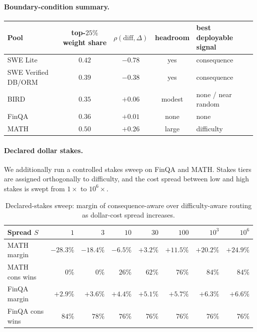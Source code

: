 \documentclass{article}
\begin{document}
\paragraph{Boundary-condition summary.}
\begin{center}
\small
\begin{tabular}{lcccl}
\toprule
Pool & top-$25\%$ weight share & $\rho(\mathrm{diff},\Delta)$ & headroom & best deployable signal \\
\midrule
SWE Lite & $0.42$ & $-0.78$ & yes & consequence \\
SWE Verified DB/ORM & $0.39$ & $-0.38$ & yes & consequence \\
BIRD & $0.35$ & $+0.06$ & modest & none / near random \\
FinQA & $0.36$ & $+0.01$ & none & none \\
MATH & $0.50$ & $+0.26$ & large & difficulty \\
\bottomrule
\end{tabular}
\end{center}

\paragraph{Declared dollar stakes.}
We additionally run a controlled stakes sweep on FinQA and MATH. Stakes
tiers are assigned orthogonally to difficulty, and the cost spread
between low and high stakes is swept from $1\times$ to $10^6\times$.

\begin{table}[h]
\centering
\caption{Declared-stakes sweep: margin of consequence-aware over
difficulty-aware routing as dollar-cost spread increases.}
\label{tab:stakescross}
\small
\begin{tabular}{lrrrrrrr}
\toprule
Spread $S$ & $1$ & $3$ & $10$ & $30$ & $100$ & $10^3$ & $10^6$ \\
\midrule
MATH margin & $-28.3\%$ & $-18.4\%$ & $-6.5\%$ & $+3.2\%$ & $+11.5\%$ & $+20.2\%$ & $+24.9\%$ \\
MATH cons wins & $0\%$ & $0\%$ & $26\%$ & $62\%$ & $76\%$ & $84\%$ & $84\%$ \\
FinQA margin & $+2.9\%$ & $+3.6\%$ & $+4.4\%$ & $+5.1\%$ & $+5.7\%$ & $+6.3\%$ & $+6.6\%$ \\
FinQA cons wins & $84\%$ & $78\%$ & $76\%$ & $76\%$ & $76\%$ & $76\%$ & $76\%$ \\
\bottomrule
\end{tabular}
\end{table}
\end{document}
